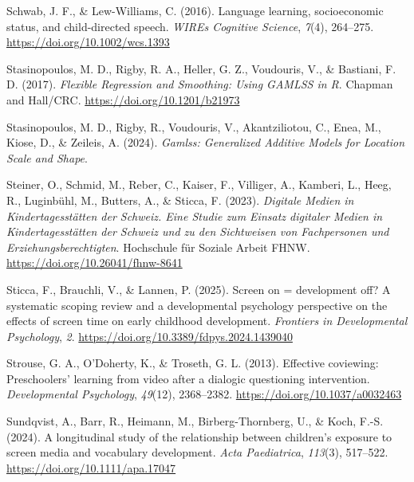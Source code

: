 \documentclass[
  man,
  floatsintext,
  longtable,
  nolmodern,
  notxfonts,
  notimes,
  colorlinks=true,linkcolor=blue,citecolor=blue,urlcolor=blue]{apa7}
\newlength{\cslhangindent}
\newenvironment{CSLReferences}[2] %
 {\begin{list}{}{%
  \setlength{\itemindent}{0pt}
  \setlength{\leftmargin}{0pt}
  \setlength{\parsep}{0pt}
  \ifodd #1
   \setlength{\leftmargin}{\cslhangindent}
   \setlength{\itemindent}{-1\cslhangindent}
  \fi
  \setlength{\itemsep}{#2\baselineskip}}}
 {\end{list}}
\begin{document}
\begin{CSLReferences}{1}{0}
Schwab, J. F., \& Lew-Williams, C. (2016). Language learning,
socioeconomic status, and child-directed speech. \emph{WIREs Cognitive
Science}, \emph{7}(4), 264--275. \url{https://doi.org/10.1002/wcs.1393}

Stasinopoulos, M. D., Rigby, R. A., Heller, G. Z., Voudouris, V., \&
Bastiani, F. D. (2017). \emph{Flexible {Regression} and {Smoothing}:
{Using GAMLSS} in {R}}. {Chapman and Hall/CRC}.
\url{https://doi.org/10.1201/b21973}

Stasinopoulos, M. D., Rigby, R., Voudouris, V., Akantziliotou, C., Enea,
M., Kiose, D., \& Zeileis, A. (2024). \emph{Gamlss: {Generalized
Additive Models} for {Location Scale} and {Shape}}.

Steiner, O., Schmid, M., Reber, C., Kaiser, F., Villiger, A., Kamberi,
L., Heeg, R., Luginbühl, M., Butters, A., \& Sticca, F. (2023).
\emph{{Digitale Medien in Kindertagesst{ä}tten der Schweiz. Eine Studie
zum Einsatz digitaler Medien in Kindertagesst{ä}tten der Schweiz und zu
den Sichtweisen von Fachpersonen und Erziehungsberechtigten}}.
Hochschule f{ü}r Soziale Arbeit FHNW.
\url{https://doi.org/10.26041/fhnw-8641}

Sticca, F., Brauchli, V., \& Lannen, P. (2025). Screen on = development
off? {A} systematic scoping review and a developmental psychology
perspective on the effects of screen time on early childhood
development. \emph{Frontiers in Developmental Psychology}, \emph{2}.
\url{https://doi.org/10.3389/fdpys.2024.1439040}

Strouse, G. A., O'Doherty, K., \& Troseth, G. L. (2013). Effective
coviewing: {Preschoolers}' learning from video after a dialogic
questioning intervention. \emph{Developmental Psychology},
\emph{49}(12), 2368--2382. \url{https://doi.org/10.1037/a0032463}

Sundqvist, A., Barr, R., Heimann, M., Birberg-Thornberg, U., \& Koch,
F.-S. (2024). A longitudinal study of the relationship between
children's exposure to screen media and vocabulary development.
\emph{Acta Paediatrica}, \emph{113}(3), 517--522.
\url{https://doi.org/10.1111/apa.17047}


\end{CSLReferences}
\end{document}
